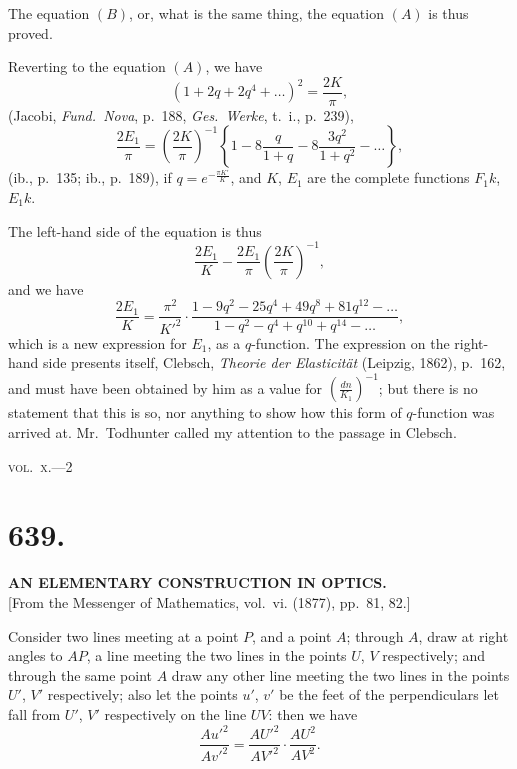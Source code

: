 \documentclass[12pt,a4paper]{article}
\theoremstyle{plain}
\theoremstyle{definition}
\theoremstyle{remark}
\begin{document}
The equation $(B)$, or, what is the same thing, the equation $(A)$ is thus proved.

Reverting to the equation $(A)$, we have
\[
(1 + 2q + 2q^4 + \ldots)^2 = \frac{2K}{\pi},
\]
(Jacobi, \textit{Fund.~Nova}, p.~188, \textit{Ges.~Werke}, t.~i., p.~239),
\[
\frac{2E_1}{\pi} = \left(\frac{2K}{\pi}\right)^{-1} \left\{1 - 8\frac{q}{1+q} - 8\frac{3q^2}{1+q^2} - \ldots\right\},
\]
(ib., p.~135; ib., p.~189),
if $q = e^{-\frac{\pi K'}{K}}$, and $K$, $E_1$ are the complete functions $F_1k$, $E_1k$.

The left-hand side of the equation is thus
\[
\frac{2E_1}{K} - \frac{2E_1}{\pi}\left(\frac{2K}{\pi}\right)^{-1},
\]
and we have
\[
\frac{2E_1}{K} = \frac{\pi^2}{K'^2} \cdot \frac{1 - 9q^2 - 25q^4 + 49q^8 + 81q^{12} - \ldots}{1 - q^2 - q^4 + q^{10} + q^{14} - \ldots},
\]
which is a new expression for $E_1$, as a $q$-function. The expression on the right-hand side presents itself, Clebsch, \textit{Theorie der Elasticit\"at} (Leipzig, 1862), p.~162, and must have been obtained by him as a value for $\left(\frac{dn}{K_1}\right)^{-1}$; but there is no statement that this is so, nor anything to show how this form of $q$-function was arrived at. Mr.~Todhunter called my attention to the passage in Clebsch.

\hfill\textsc{vol.~x.}---2

\clearpage
\setcounter{page}{28}

\section*{639.}

\begin{center}
\textbf{AN ELEMENTARY CONSTRUCTION IN OPTICS.}\\[1em]
[From the Messenger of Mathematics, vol.~vi. (1877), pp.~81, 82.]
\end{center}

Consider two lines meeting at a point $P$, and a point $A$; through $A$, draw at right angles to $AP$, a line meeting the two lines in the points $U$, $V$ respectively; and through the same point $A$ draw any other line meeting the two lines in the points $U'$, $V'$ respectively; also let the points $u'$, $v'$ be the feet of the perpendiculars let fall from $U'$, $V'$ respectively on the line $UV$: then we have
\[
\frac{Au'^2}{Av'^2} = \frac{AU'^2}{AV'^2} \cdot \frac{AU^2}{AV^2}.
\]
\end{document}
